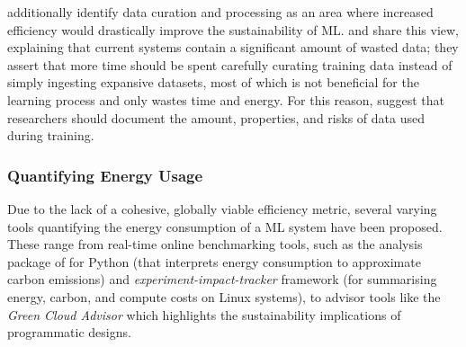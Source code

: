 \documentclass[a4paper, 12pt]{article}
\begin{document}
    \citet{aljarrah-2015} additionally identify data curation and processing as an area where increased efficiency would drastically improve the sustainability of ML. \citet{bietti-2019} and \citet{bender-2021} share this view, explaining that current systems contain a significant amount of wasted data; they assert that more time should be spent carefully curating training data instead of simply ingesting expansive datasets, most of which is not beneficial for the learning process and only wastes time and energy. For this reason, \citet{bender-2021} suggest that researchers should document the amount, properties, and risks of data used during training.

    \subsubsection{Quantifying Energy Usage}

    Due to the lack of a cohesive, globally viable efficiency metric, several varying tools quantifying the energy consumption of a ML system have been proposed. These range from real-time online benchmarking tools, such as the analysis package of \citet{lottick-2019} for Python (that interprets energy consumption to approximate carbon emissions) and \emph{experiment-impact-tracker} framework \citep{henderson-2020} (for summarising energy, carbon, and compute costs on Linux systems), to advisor tools like the \emph{Green Cloud Advisor} \citep{sharma-kaulgud-2021} which highlights the sustainability implications of programmatic designs.
\end{document}
